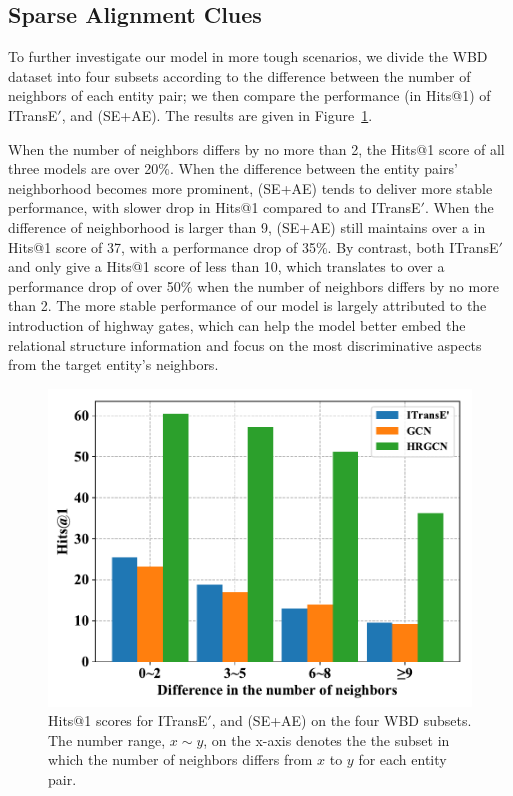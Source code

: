 \subsection{Sparse Alignment Clues}
To further investigate our model in more tough scenarios,
we divide the WBD dataset into four subsets according to the difference between the number of neighbors of each entity pair; we then compare the performance (in Hits@1) of ITransE$'$,  \GCN and \HRGCN (SE+AE). %
The results are given in Figure~\ref{subset}.

When the number of neighbors differs by no more than 2, the Hits@1 score of all three models are over 20\%. When the difference between the
entity pairs' neighborhood becomes more prominent, \HRGCN (SE+AE) tends to deliver more stable performance, with slower drop in Hits@1
compared to \GCN and ITransE$'$. When the difference of neighborhood is larger than 9, \HRGCN (SE+AE) still maintains over a in Hits@1
score of 37, with a performance drop of 35\%. By contrast, both ITransE$'$ and \GCN only give a Hits@1 score of less than 10, which
translates to over a performance drop of over 50\% when the number of neighbors differs by no more than 2. The more stable performance of
our \HRGCN model is largely attributed to the introduction of highway gates, which can help the model better embed the relational structure
information and focus on the most discriminative aspects from the target entity's neighbors.


\begin{figure}
	\centering
	\includegraphics[width=0.85\linewidth]{figures/graph4.pdf}
	\caption{Hits@1 scores for ITransE$'$, \GCN and \HRGCN (SE+AE) on the four WBD subsets. The number range, $x\sim y$, on the
x-axis denotes the the subset in which the number of neighbors differs from $x$ to $y$ for each entity pair.}
	\label{subset}
\end{figure}

